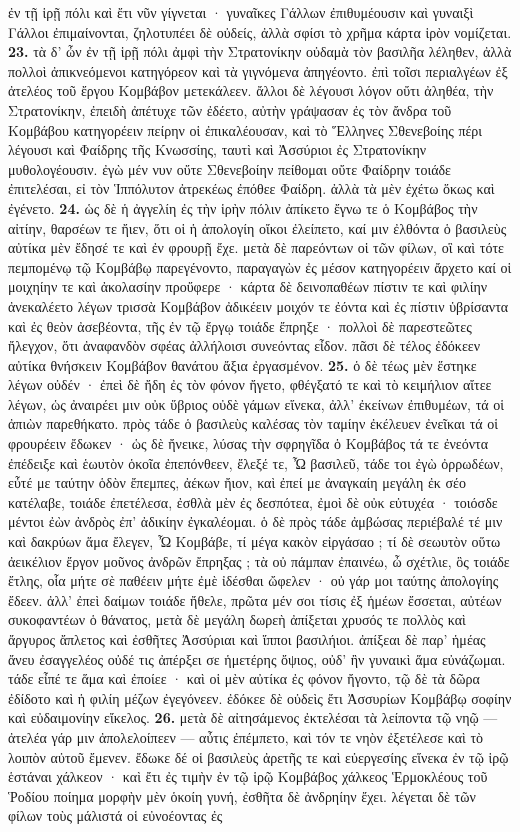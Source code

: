 \documentclass[a4paper, 11pt, oneside, polutonikogreek, german]{article}
\begin{document}
ἐν τῇ ἱρῇ πόλι καὶ ἔτι νῦν γίγνεται · γυναῖκες Γάλλων ἐπιθυμέουσιν καὶ γυναιξὶ Γάλλοι ἐπιμαίνονται, ζηλοτυπέει δὲ οὐδείς, ἀλλὰ σφίσι τὸ χρῆμα κάρτα ἱρὸν νομίζεται. \textbf{23.} τὰ δ' ὦν ἐν τῇ ἱρῇ πόλι ἀμφὶ τὴν Στρατονίκην οὐδαμὰ τὸν βασιλῆα λέληθεν, ἀλλὰ πολλοὶ ἀπικνεόμενοι κατηγόρεον καὶ τὰ γιγνόμενα ἀπηγέοντο. ἐπὶ τοῖσι περιαλγέων ἐξ ἀτελέος τοῦ ἔργου Κομβάβον μετεκάλεεν. ἄλλοι δὲ λέγουσι λόγον οὔτι ἀληθέα, τὴν Στρατονίκην, ἐπειδὴ ἀπέτυχε τῶν ἐδέετο, αὐτὴν γράψασαν ἐς τὸν ἄνδρα τοῦ Κομβάβου κατηγορέειν πείρην οἱ ἐπικαλέουσαν, καὶ τὸ Ἕλληνες Σθενεβοίης πέρι λέγουσι καὶ Φαίδρης τῆς Κνωσσίης, ταυτὶ καὶ Ἀσσύριοι ἐς Στρατονίκην μυθολογέουσιν. ἐγὼ μέν νυν οὔτε Σθενεβοίην πείθομαι οὔτε Φαίδρην τοιάδε ἐπιτελέσαι, εἰ τὸν Ἱππόλυτον ἀτρεκέως ἐπόθεε Φαίδρη. ἀλλὰ τὰ μὲν ἐχέτω ὅκως καὶ ἐγένετο. \textbf{24.} ὡς δὲ ἡ ἀγγελίη ἐς τὴν ἱρὴν πόλιν ἀπίκετο ἔγνω τε ὁ Κομβάβος τὴν αἰτίην, θαρσέων τε ἤιεν, ὅτι οἱ ἡ ἀπολογίη οἴκοι ἐλείπετο, καί μιν ἐλθόντα ὁ βασιλεὺς αὐτίκα μὲν ἔδησέ τε καὶ ἐν φρουρῇ ἔχε. μετὰ δὲ παρεόντων οἱ τῶν φίλων, οἳ καὶ τότε πεμπομένῳ τῷ Κομβάβῳ παρεγένοντο, παραγαγὼν ἐς μέσον κατηγορέειν ἄρχετο καί οἱ μοιχηίην τε καὶ ἀκολασίην προὔφερε · κάρτα δὲ δεινοπαθέων πίστιν τε καὶ φιλίην ἀνεκαλέετο λέγων τρισσὰ Κομβάβον ἀδικέειν μοιχόν τε ἐόντα καὶ ἐς πίστιν ὑβρίσαντα καὶ ἐς θεὸν ἀσεβέοντα, τῆς ἐν τῷ ἔργῳ τοιάδε ἔπρηξε · πολλοὶ δὲ παρεστεῶτες ἤλεγχον, ὅτι ἀναφανδὸν σφέας ἀλλήλοισι συνεόντας εἶδον. πᾶσι δὲ τέλος ἐδόκεεν αὐτίκα θνήσκειν Κομβάβον θανάτου ἄξια ἐργασμένον. \textbf{25.} ὁ δὲ τέως μὲν ἕστηκε λέγων οὐδέν · ἐπεὶ δὲ ἤδη ἐς τὸν φόνον ἤγετο, φθέγξατό τε καὶ τὸ κειμήλιον αἴτεε λέγων, ὡς ἀναιρέει μιν οὐκ ὕβριος οὐδὲ γάμων εἵνεκα, ἀλλ' ἐκείνων ἐπιθυμέων, τά οἱ ἀπιὼν παρεθήκατο. πρὸς τάδε ὁ βασιλεὺς καλέσας τὸν ταμίην ἐκέλευεν ἐνεῖκαι τά οἱ φρουρέειν ἔδωκεν · ὡς δὲ ἤνεικε, λύσας τὴν σφρηγῖδα ὁ Κομβάβος τά τε ἐνεόντα ἐπέδειξε καὶ ἑωυτὸν ὁκοῖα ἐπεπόνθεεν, ἔλεξέ τε, Ὦ βασιλεῦ, τάδε τοι ἐγὼ ὀρρωδέων, εὖτέ με ταύτην ὁδὸν ἔπεμπες, ἀέκων ἤιον, καὶ ἐπεί με ἀναγκαίη μεγάλη ἐκ σέο κατέλαβε, τοιάδε ἐπετέλεσα, ἐσθλὰ μὲν ἐς δεσπότεα, ἐμοὶ δὲ οὐκ εὐτυχέα · τοιόσδε μέντοι ἐὼν ἀνδρὸς ἐπ' ἀδικίην ἐγκαλέομαι. ὁ δὲ πρὸς τάδε ἀμβώσας περιέβαλέ τέ μιν καὶ δακρύων ἅμα ἔλεγεν, Ὦ Κομβάβε, τί μέγα κακὸν εἰργάσαο ; τί δὲ σεωυτὸν οὕτω ἀεικέλιον ἔργον μοῦνος ἀνδρῶν ἔπρηξας ; τὰ οὐ πάμπαν ἐπαινέω, ὦ σχέτλιε, ὃς τοιάδε ἔτλης, οἷα μήτε σὲ παθέειν μήτε ἐμὲ ἰδέσθαι ὤφελεν · οὐ γάρ μοι ταύτης ἀπολογίης ἔδεεν. ἀλλ' ἐπεὶ δαίμων τοιάδε ἤθελε, πρῶτα μέν σοι τίσις ἐξ ἡμέων ἔσσεται, αὐτέων συκοφαντέων ὁ θάνατος, μετὰ δὲ μεγάλη δωρεὴ ἀπίξεται χρυσός τε πολλὸς καὶ ἄργυρος ἄπλετος καὶ ἐσθῆτες Ἀσσύριαι καὶ ἵπποι βασιλήιοι. ἀπίξεαι δὲ παρ' ἡμέας ἄνευ ἐσαγγελέος οὐδέ τις ἀπέρξει σε ἡμετέρης ὄψιος, οὐδ' ἢν γυναικὶ ἅμα εὐνάζωμαι. τάδε εἶπέ τε ἅμα καὶ ἐποίεε · καὶ οἱ μὲν αὐτίκα ἐς φόνον ἤγοντο, τῷ δὲ τὰ δῶρα ἐδίδοτο καὶ ἡ φιλίη μέζων ἐγεγόνεεν. ἐδόκεε δὲ οὐδεὶς ἔτι Ἀσσυρίων Κομβάβῳ σοφίην καὶ εὐδαιμονίην εἴκελος. \textbf{26.} μετὰ δὲ αἰτησάμενος ἐκτελέσαι τὰ λείποντα τῷ νηῷ --- ἀτελέα γάρ μιν ἀπολελοίπεεν --- αὖτις ἐπέμπετο, καὶ τόν τε νηὸν ἐξετέλεσε καὶ τὸ λοιπὸν αὐτοῦ ἔμενεν. ἔδωκε δέ οἱ βασιλεὺς ἀρετῆς τε καὶ εὐεργεσίης εἵνεκα ἐν τῷ ἱρῷ ἑστάναι χάλκεον · καὶ ἔτι ἐς τιμὴν ἐν τῷ ἱρῷ Κομβάβος χάλκεος Ἑρμοκλέους τοῦ Ῥοδίου ποίημα μορφὴν μὲν ὁκοίη γυνή, ἐσθῆτα δὲ ἀνδρηίην ἔχει. λέγεται δὲ τῶν φίλων τοὺς μάλιστά οἱ εὐνοέοντας ἐς 
\end{document}
